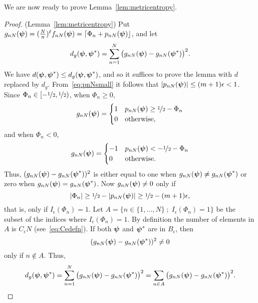 \documentclass[aap,preprint]{imsart}
\renewcommand{\mid}{\; ; \;}
\newcommand{\abs}[1]{\left\vert #1 \right\vert}
\newcommand{\round}[1]{{\left\lceil #1 \right\rfloor}}
\begin{document}
We are now ready to prove Lemma~\ref{lem:metricentropy}.

\begin{proof} (Lemma~\ref{lem:metricentropy})
Put $g_{nN}(\psibf) = (\tfrac{N}{n})^\ell f_{nN}(\psibf) = \round{ \Phi_n + p_{nN}(\psibf)}$, and let
\[
d_g(\boldsymbol{\psi}, \boldsymbol{\psi}^*) = \sum_{n=1}^{N} \big( g_{nN}(\boldsymbol{\psi}) - g_{nN}(\boldsymbol{\psi}^*) \big)^2.
\]
We have $d(\boldsymbol{\psi}, \boldsymbol{\psi}^*) \leq d_g(\boldsymbol{\psi}, \boldsymbol{\psi}^*)$, and so it suffices to prove the lemma with $d$ replaced by $d_g$.  
From~\eqref{eq:pnNsmall} it follows that $\abs{p_{nN}(\psibf)} \leq (m+1)\epsilon < 1$.  Since $\Phi_n \in [-\nicefrac{1}{2}, \nicefrac{1}{2})$, when $\Phi_n \geq 0$,
\[
g_{nN}(\psibf) = \begin{cases}
1 & p_{nN}(\psibf) \geq \nicefrac{1}{2} - \Phi_n \\
0 & \text{otherwise},
\end{cases}
\]
and when $\Phi_n < 0$,
\[
g_{nN}(\psibf) = \begin{cases}
-1 & p_{nN}(\psibf) < -\nicefrac{1}{2} - \Phi_n \\
0 & \text{otherwise}.
\end{cases}
\]
Thus, $( g_{nN}(\boldsymbol{\psi}) - g_{nN}(\boldsymbol{\psi}^*) )^2$ is either equal to one when $g_{nN}(\boldsymbol{\psi}) \neq g_{nN}(\boldsymbol{\psi}^*)$ or zero when $g_{nN}(\boldsymbol{\psi}) = g_{nN}(\boldsymbol{\psi}^*)$.  Now $g_{nN}(\boldsymbol{\psi}) \neq 0$ only if 
\[
\abs{\Phi_n} \geq \nicefrac{1}{2} - \abs{p_{nN}(\psibf)} \geq \nicefrac{1}{2} - (m+1)\epsilon,
\]
that is, only if $I_\epsilon(\Phi_n) = 1$.  Let $A = \{ n \in \{1, \dots, N\} \mid I_\epsilon(\Phi_n) = 1 \}$ be the subset of the indices where $I_\epsilon(\Phi_n) = 1$.  By definition the number of elements in $A$ is $C_\epsilon N$ (see~\eqref{eq:Cedefn}).  If both $\boldsymbol{\psi}$ and $\boldsymbol{\psi}^*$ are in $B_\epsilon$, then 
\[
(g_{nN}(\boldsymbol{\psi}) - g_{nN}(\boldsymbol{\psi}^*) )^2 \neq 0 
\]
only if $n \notin A$.  Thus,
\begin{align*}
d_g(\psibf, \psibf^*) = \sum_{n=1}^{N} \big( g_{nN}(\psibf) - g_{nN}(\psibf^*) \big)^2 = \sum_{n \in A} \big( g_{nN}(\psibf) - g_{nN}(\psibf^*) \big)^2.
\end{align*}


\end{proof}
\end{document}
